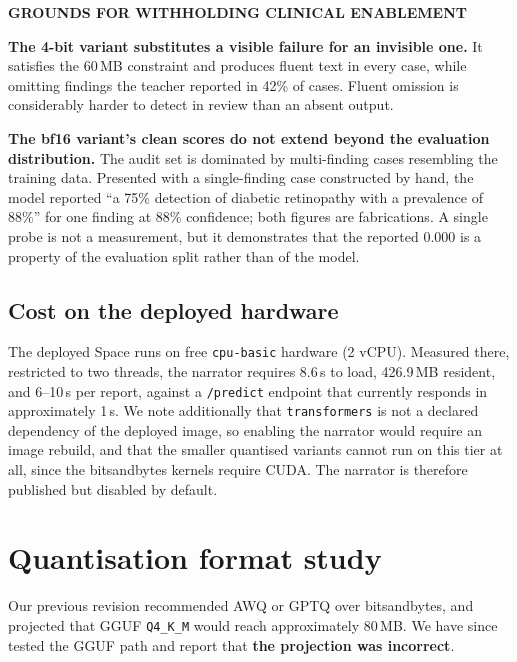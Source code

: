 \documentclass[11pt,a4paper]{article}
\newcommand{\code}[1]{\texttt{\small #1}}
\newcommand{\eyebrow}[1]{%
  {\footnotesize\sffamily\bfseries\textcolor{accent}{\MakeUppercase{#1}}}}
\begin{document}
\begin{callout}[stopRed]
\eyebrow{Grounds for withholding clinical enablement}

\vspace{3pt}
\textbf{The 4-bit variant substitutes a visible failure for an invisible one.}
It satisfies the 60\,MB constraint and produces fluent text in every case, while
omitting findings the teacher reported in 42\% of cases. Fluent omission is
considerably harder to detect in review than an absent output.

\vspace{4pt}
\textbf{The bf16 variant's clean scores do not extend beyond the evaluation
distribution.} The audit set is dominated by multi-finding cases resembling the
training data. Presented with a single-finding case constructed by hand, the
model reported ``a 75\% detection of diabetic retinopathy with a prevalence of
88\%'' for one finding at 88\% confidence; both figures are fabrications. A
single probe is not a measurement, but it demonstrates that the reported 0.000
is a property of the evaluation split rather than of the model.
\end{callout}

\subsection{Cost on the deployed hardware}

The deployed Space runs on free \code{cpu-basic} hardware (2 vCPU). Measured
there, restricted to two threads, the narrator requires 8.6\,s to load, 426.9\,MB
resident, and 6--10\,s per report, against a \code{/predict} endpoint that
currently responds in approximately 1\,s. We note additionally that
\code{transformers} is not a declared dependency of the deployed image, so
enabling the narrator would require an image rebuild, and that the smaller
quantised variants cannot run on this tier at all, since the bitsandbytes
kernels require CUDA. The narrator is therefore published but disabled by
default.

\section{Quantisation format study}

Our previous revision recommended AWQ or GPTQ over bitsandbytes, and projected
that GGUF \code{Q4\_K\_M} would reach approximately 80\,MB. We have since tested
the GGUF path and report that \textbf{the projection was incorrect}.
\end{document}
